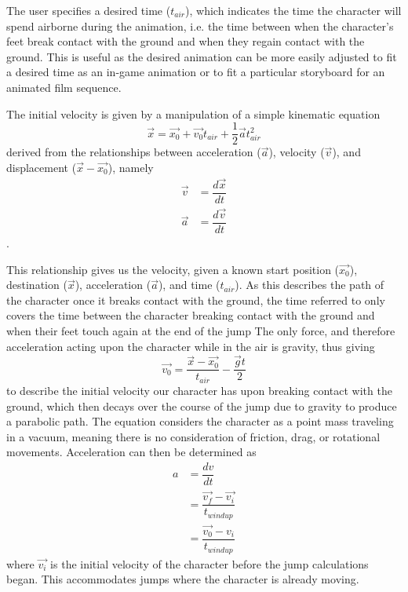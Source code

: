 The user specifies a desired time ($t_{air}$), which indicates the time the character will spend airborne during the animation, i.e. the time between when the character's feet break contact with the ground and when they regain contact with the ground.  This is useful as the desired animation can be more easily adjusted to fit a desired time as an in-game animation or to fit a particular storyboard for an animated film sequence.

The initial velocity is given by a manipulation of a simple kinematic equation \[ \vec{x} = \vec{x_0} + \vec{v_0} t_{air} + \frac{1}{2} \vec{a} t_{air}^2 \] derived from the relationships between acceleration ($\vec{a}$), velocity ($\vec{v}$), and displacement ($\vec{x} - \vec{x_0}$), namely
\begin{align*}
	\vec{v} &= \dfrac{d\vec{x}}{dt} \\
	\vec{a} &= \dfrac{d\vec{v}}{dt}
\end{align*}.

This relationship gives us the velocity, given a known start position ($\vec{x_0}$), destination ($\vec{x}$), acceleration ($\vec{a}$), and time ($t_{air}$).  As this describes the path of the character once it breaks contact with the ground, the time referred to only covers the time between the character breaking contact with the ground and when their feet touch again at the end of the jump  The only force, and therefore acceleration acting upon the character while in the air is gravity, thus giving 
\[ \vec{v_0} = \dfrac{\vec{x} - \vec{x_0}}{t_{air}} - \dfrac{\vec{g}t}{2} \]
to describe the initial velocity our character has upon breaking contact with the ground, which then decays over the course of the jump due to gravity to produce a parabolic path.  The equation considers the character as a point mass traveling in a vacuum, meaning there is no consideration of friction, drag, or rotational movements.  Acceleration can then be determined as 
\begin{align*}
	a &= \dfrac{dv}{dt} \\
	&= \dfrac{\vec{v_f} - \vec{v_i}}{t_{windup}} \\
	&= \dfrac{\vec{v_0} - {v_i}}{t_{windup}}
\end{align*}
where $\vec{v_i}$ is the initial velocity of the character before the jump calculations began.  This accommodates jumps where the character is already moving.


